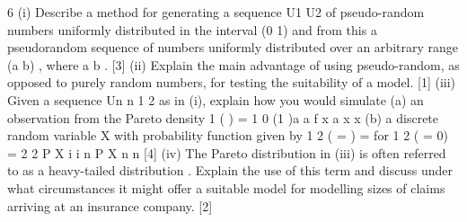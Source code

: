 \documentclass[a4paper,12pt]{article}
\begin{document}
\begin{enumerate}

6 (i) Describe a method for generating a sequence U1 U2 of pseudo-random
numbers uniformly distributed in the interval (0 1) and from this a pseudorandom
sequence of numbers uniformly distributed over an arbitrary
range (a b) , where a b . [3]
(ii) Explain the main advantage of using pseudo-random, as opposed to purely
random numbers, for testing the suitability of a model. [1]
(iii) Given a sequence {Un n 1 2 } as in (i), explain how you would simulate
(a) an observation from the Pareto density
1 ( ) = 1 0
(1 )a
a
f x a x
x
(b) a discrete random variable X with probability function given by
1 2
( = ) = for 1 2 ( = 0) =
2 2
P X i i n P X
n n
[4]
(iv) The Pareto distribution in (iii) is often referred to as a heavy-tailed
distribution . Explain the use of this term and discuss under what
circumstances it might offer a suitable model for modelling sizes of claims
arriving at an insurance company. [2]

\newpage


\end{enumerate}
\end{document}
